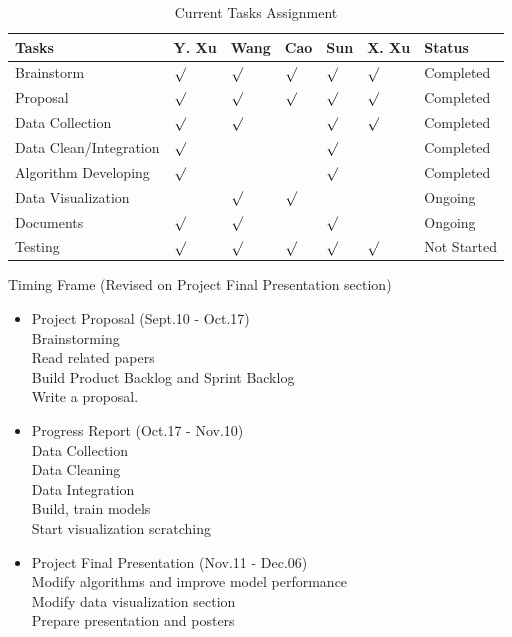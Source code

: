 \documentclass[letterpaper, 10 pt, conference]{ieeeconf}  %
\begin{document}
\begin{table}[ht]
\centering
\begin{tabular}{p{2cm} p{0.6cm} p{0.6cm} p{0.4cm} p{0.4cm} p{0.6cm} p{1.0cm}}
\hline
Tasks & Y. Xu & Wang & Cao & Sun & X. Xu & Status
 \\\hline
Brainstorm & $\surd$ & $\surd$ & $\surd$ & $\surd$ & $\surd$ & Completed\\
Proposal & $\surd$ & $\surd$ & $\surd$ & $\surd$ & $\surd$ & Completed\\
Data Collection & $\surd$ & $\surd$  &  & $\surd$ & $\surd$  & Completed\\
Data Clean/Integration & $\surd$  & & & $\surd$ & & Completed\\
Algorithm Developing & $\surd$ &  &  & $\surd$ &  & Completed\\
Data Visualization &  & $\surd$ & $\surd$ &  &  & Ongoing\\
Documents & $\surd$ & $\surd$ & & $\surd$ & & Ongoing\\
Testing & $\surd$ & $\surd$ & $\surd$ & $\surd$ & $\surd$ & Not Started\\
\hline
\end{tabular}
\caption{Current Tasks Assignment}
\end{table}


Timing Frame (Revised on Project Final Presentation section)
\begin{itemize}
\item Project Proposal (Sept.10 - Oct.17)\\
Brainstorming\\
Read related papers\\
Build Product Backlog and Sprint Backlog\\
Write a proposal.
\item Progress Report (Oct.17 - Nov.10)\\
Data Collection\\
Data Cleaning\\
Data Integration\\
Build, train models\\
Start visualization scratching
\item Project Final Presentation (Nov.11 - Dec.06)\\
Modify algorithms and improve model performance\\
Modify data visualization section\\
Prepare presentation and posters
\end{itemize}
\end{document}
